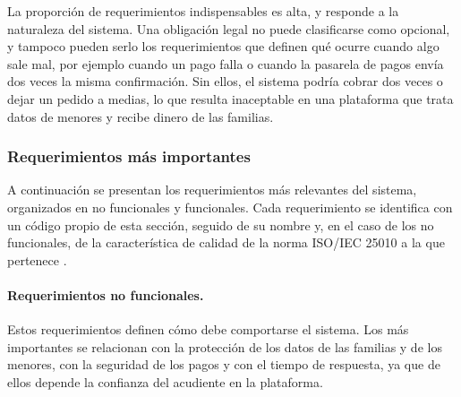 La proporción de requerimientos indispensables es alta, y responde a la naturaleza del
sistema. Una obligación legal no puede clasificarse como opcional, y tampoco pueden serlo los
requerimientos que definen qué ocurre cuando algo sale mal, por ejemplo cuando un pago falla
o cuando la pasarela de pagos envía dos veces la misma confirmación. Sin ellos, el sistema
podría cobrar dos veces o dejar un pedido a medias, lo que resulta inaceptable en una
plataforma que trata datos de menores y recibe dinero de las familias.\par

\subsubsection{Requerimientos más importantes}

A continuación se presentan los requerimientos más relevantes del sistema, organizados en no
funcionales y funcionales. Cada requerimiento se identifica con un código propio de esta
sección, seguido de su nombre y, en el caso de los no funcionales, de la característica de
calidad de la norma ISO/IEC 25010 a la que pertenece \citep{iso_25010_2011}.\par

\paragraph{Requerimientos no funcionales.} Estos requerimientos definen cómo debe comportarse
el sistema. Los más importantes se relacionan con la protección de los datos de las familias
y de los menores, con la seguridad de los pagos y con el tiempo de respuesta, ya que de ellos
depende la confianza del acudiente en la plataforma.\par

